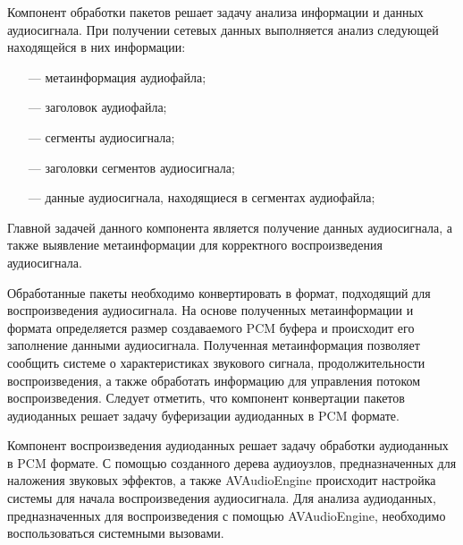             \par Компонент обработки пакетов решает задачу анализа информации и данных аудиосигнала.
            При получении сетевых данных выполняется анализ следующей находящейся в них информации:
            \begin{itemize}
                \item[---] метаинформация аудиофайла;
                \item[---] заголовок аудиофайла;
                \item[---] сегменты аудиосигнала;
                \item[---] заголовки сегментов аудиосигнала;
                \item[---] данные аудиосигнала, находящиеся в сегментах аудиофайла;
            \end{itemize}

            \par Главной задачей данного компонента является получение данных аудиосигнала, 
            а также выявление метаинформации для корректного воспроизведения аудиосигнала.

            \par Обработанные пакеты необходимо конвертировать в формат, подходящий для воспроизведения аудиосигнала.
            На основе полученных метаинформации и формата определяется размер создаваемого PCM буфера 
            и происходит его заполнение данными аудиосигнала. 
            Полученная метаинформация позволяет сообщить системе о характеристиках звукового сигнала, 
            продолжительности воспроизведения, а также обработать информацию для управления потоком воспроизведения.
            Следует отметить, что компонент конвертации пакетов аудиоданных решает задачу буферизации аудиоданных в PCM формате.
        
            \par Компонент воспроизведения аудиоданных решает задачу обработки аудиоданных в PCM формате.
            С помощью созданного дерева аудиоузлов, предназначенных для наложения звуковых эффектов, 
            а также AVAudioEngine происходит настройка системы для начала воспроизведения аудиосигнала.
            Для анализа аудиоданных, предназначенных для воспроизведения с помощью \newline AVAudioEngine, 
            необходимо воспользоваться системными вызовами.

